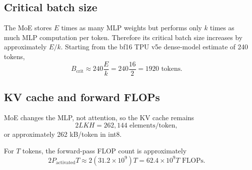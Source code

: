 \documentclass[11pt]{article}
\begin{document}
\subsection*{Critical batch size}

The MoE stores $E$ times as many MLP weights but performs only $k$ times as
much MLP computation per token. Therefore its critical batch size increases
by approximately $E/k$. Starting from the bf16 TPU v5e dense-model estimate
of 240 tokens,
\[
B_{\mathrm{crit}}
\approx240\frac{E}{k}
=240\frac{16}{2}
=\boxed{1920\text{ tokens}}.
\]

\subsection*{KV cache and forward FLOPs}

MoE changes the MLP, not attention, so the KV cache remains
\[
\boxed{2LKH=262{,}144\text{ elements/token}},
\]
or approximately 262 kB/token in int8.

For $T$ tokens, the forward-pass FLOP count is approximately
\[
2P_{\mathrm{activated}}T
\approx2(31.2\times10^9)T
=\boxed{62.4\times10^9T\text{ FLOPs}}.
\]
\end{document}
